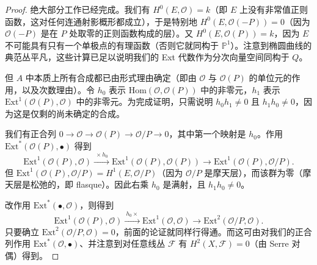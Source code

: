 \begin{proof}
绝大部分工作已经完成。我们有 $H^0(E,\mathcal{O})=k$（即 $E$ 上没有非常值正则函数，这对任何连通射影概形都成立），于是特别地 $H^0(E,\mathcal{O}(-P))=0$（因为 $\mathcal{O}(-P)$ 是在 $P$ 处取零的正则函数构成的层）。又 $H^0(E,\mathcal{O}(P))=k$，因为 $E$ 不可能具有只有一个单极点的有理函数（否则它就同构于 $\mathbb{P}^1$）。注意到椭圆曲线的典范丛平凡，这些计算已足以说明我们的 Ext 代数作为分次向量空间同构于 $Q$。

但 $A$ 中本质上所有合成都已由形式理由确定（即由 $\mathcal{O}$ 与 $\mathcal{O}(P)$ 的单位元的作用，以及次数理由）。令 $h_0$ 表示 $\mathrm{Hom}(\mathcal{O},\mathcal{O}(P))$ 中的非零元，$h_1$ 表示 $\mathrm{Ext}^1(\mathcal{O}(P),\mathcal{O})$ 中的非零元。为完成证明，只需说明 $h_0h_1\neq0$ 且 $h_1h_0\neq0$，因为这是仅剩的尚未确定的合成。


我们有正合列 $0\to\mathcal{O}\to\mathcal{O}(P)\to\mathcal{O}/P\to0$，其中第一个映射是 $h_0$。作用 $\mathrm{Ext}^*(\mathcal{O}(P),\bullet)$ 得到
\[
\mathrm{Ext}^1(\mathcal{O}(P),\mathcal{O})\xrightarrow{\ \times h_0\ }\mathrm{Ext}^1(\mathcal{O}(P),\mathcal{O}(P))\to\mathrm{Ext}^1(\mathcal{O}(P),\mathcal{O}/P).
\]
但 $\mathrm{Ext}^1(\mathcal{O}(P),\mathcal{O}/P)=H^1(E,\mathcal{O}/P)$（因为 $\mathcal{O}/P$ 是摩天层），而该群为零（摩天层是松弛的，即 flasque）。因此右乘 $h_0$ 是满射，且 $h_1h_0\neq0$。


改作用 $\mathrm{Ext}^*(\bullet,\mathcal{O})$，则得到
\[
\mathrm{Ext}^1(\mathcal{O}(P),\mathcal{O})\xrightarrow{\ h_0\times\ }\mathrm{Ext}^1(\mathcal{O},\mathcal{O})\to\mathrm{Ext}^2(\mathcal{O}/P,\mathcal{O}).
\]
只要确立 $\mathrm{Ext}^2(\mathcal{O}/P,\mathcal{O})=0$，前面的论证就同样行得通。而这可由对我们的正合列作用 $\mathrm{Ext}^*(\mathcal{O},\bullet)$、并注意到对任意线丛 $\mathcal{F}$ 有 $H^2(X,\mathcal{F})=0$（由 Serre 对偶）得到。
\end{proof}

